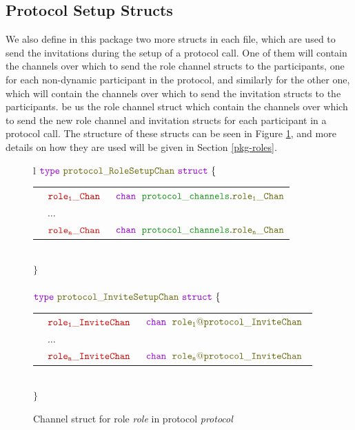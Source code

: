 \documentclass[12pt,twoside]{report}
\begin{document}
\subsection{Protocol Setup Structs}\label{protocol-setup-structs}

We also define in this package two more structs in each file, which are used to send the invitations during the setup of a protocol call. One of them will contain the channels over which to send the role channel structs to the participants, one for each non-dynamic participant in the protocol, and similarly for the other one, which will contain the channels over which to send the invitation structs to the participants. be us the role channel struct which contain the channels over which to send the new role channel and invitation structs for each participant in a protocol call. The structure of these structs can be seen in Figure \ref{protocol-setup-structs-gen}, and more details on how they are used will be given in Section \ref{pkg-roles}.

\begin{figure}[!h]
    \begin{center}
        \begin{tabular}{l}
            $\gotype\ \structname{protocol\_\!RoleSetupChan}\ \gostruct\ \{$\\[3pt]
            \begin{tabular}{lll}
                \indent & $\structfield{role_1\_Chan}$\ &$\gochan\ \;\pkgstructaccess{protocol\_channels}{role_1\_Chan}$\\
                \indent & $\dots$ & \\
                \indent & $\structfield{role_n\_Chan}$\ &$\gochan\ \;\pkgstructaccess{protocol\_channels}{role_n\_Chan}$
            \end{tabular}\\
            $\}$\\\\[10pt]
            $\gotype\ \structname{protocol\_\!InviteSetupChan}\ \gostruct\ \{$\\[3pt]
            \begin{tabular}{lll}
                \indent & $\structfield{role_1\_InviteChan}$\ &$\gochan\ \;\structname{role_1@protocol\_InviteChan}$\\
                \indent & $\dots$ & \\
                \indent & $\structfield{role_n\_InviteChan}$\ &$\gochan\ \;\structname{role_n@protocol\_InviteChan}$\
            \end{tabular}\\
            $\}$
        \end{tabular}
    \end{center}
    \caption{Channel struct for role \textit{role} in protocol \textit{protocol}}
    \label{protocol-setup-structs-gen}
\end{figure}
\end{document}
